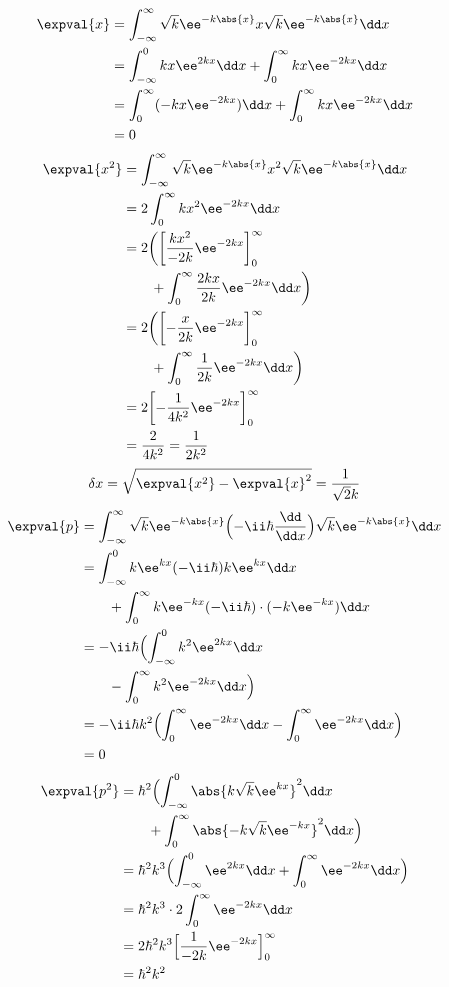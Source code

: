 \begin{align*}
\expval{x}&=\int_{-\infty}^{\infty}\sqrt{k}\ee^{-k\abs{x}}x\sqrt{k}\ee^{-k\abs{x}}\dd x\\
&=\int_{-\infty}^{0}kx\ee^{2kx}\dd x+\int_{0}^{\infty}kx\ee^{-2kx}\dd x\\
&=\int_{0}^{\infty}(-kx\ee^{-2kx})\dd x+\int_{0}^{\infty}kx\ee^{-2kx}\dd x\\
&=0
\end{align*}
\begin{align*}
\expval{x^{2}}&=\int_{-\infty}^{\infty}\sqrt{k}\ee^{-k\abs{x}}x^{2}\sqrt{k}\ee^{-k\abs{x}}\dd x\\
&=2\int_{0}^{\infty}kx^{2}\ee^{-2kx}\dd x\\
&=2\biggl(\biggl[\frac{kx^{2}}{-2k}\ee^{-2kx}\biggr]_{0}^{\infty}\\
&\qquad+\int_{0}^{\infty}\frac{2kx}{2k}\ee^{-2kx}\dd x\biggr)\\
&=2\biggl(\biggl[-\frac{x}{2k}\ee^{-2kx}\biggr]_{0}^{\infty}\\
&\qquad+\int_{0}^{\infty}\frac{1}{2k}\ee^{-2kx}\dd x\biggr)\\
&=2\biggl[-\frac{1}{4k^{2}}\ee^{-2kx}\biggr]_{0}^{\infty}\\
&=\frac{2}{4k^{2}}=\frac{1}{2k^{2}}
\end{align*}
\[ \delta x=\sqrt{\expval{x^{2}}-\expval{x}^{2}}=\frac{1}{\sqrt{2}k} \]
\begin{align*}
\expval{p}&=\int_{-\infty}^{\infty}\sqrt{k}\ee^{-k\abs{x}}\Bigl(-\ii\hbar\frac{\dd}{\dd x}\Bigr)\sqrt{k}\ee^{-k\abs{x}}\dd x\\
&=\int_{-\infty}^{0}k\ee^{kx}(-\ii\hbar)k\ee^{kx}\dd x\\
&\qquad+\int_{0}^{\infty}k\ee^{-kx}(-\ii\hbar)\cdot(-k\ee^{-kx})\dd x\\
&=-\ii\hbar\Bigl(\int_{-\infty}^{0}k^{2}\ee^{2kx}\dd x\\
&\qquad-\int_{0}^{\infty}k^{2}\ee^{-2kx}\dd x\Bigr)\\
&=-\ii\hbar k^{2}\Bigl(\int_{0}^{\infty}\ee^{-2kx}\dd x-\int_{0}^{\infty}\ee^{-2kx}\dd x\Bigr)\\
&=0
\end{align*}
\begin{align*}
\expval{p^{2}}&=\hbar^{2}\Bigl(\int_{-\infty}^{0}\abs{k\sqrt{k}\ee^{kx}}^{2}\dd x\\
&\qquad+\int_{0}^{\infty}\abs{-k\sqrt{k}\ee^{-kx}}^{2}\dd x\Bigr)\\
&=\hbar^{2}k^{3}\Bigl(\int_{-\infty}^{0}\ee^{2kx}\dd x+\int_{0}^{\infty}\ee^{-2kx}\dd x\Bigr)\\
&=\hbar^{2}k^{3}\cdot2\int_{0}^{\infty}\ee^{-2kx}\dd x\\
&=2\hbar^{2}k^{3}\Bigl[\frac{1}{-2k}\ee^{-2kx}\Bigr]_{0}^{\infty}\\
&=\hbar^{2}k^{2}
\end{align*}
